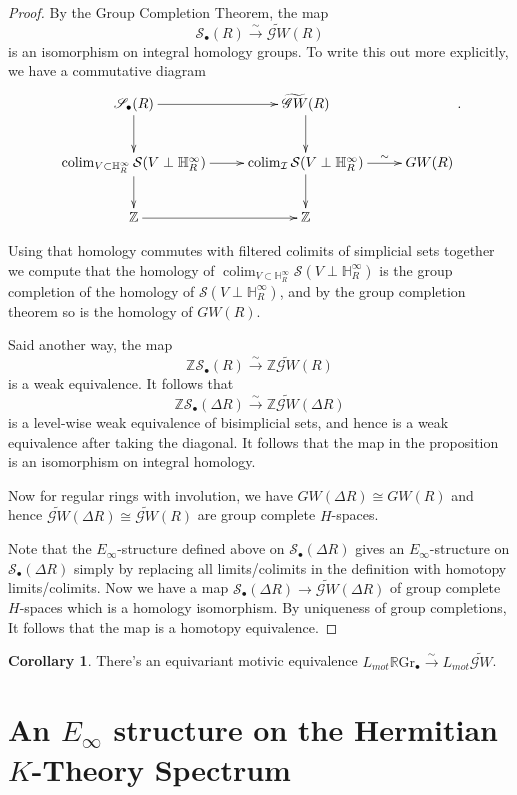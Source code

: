 \documentclass[draftthesis,tocnosub,noragright,centerchapter,10pt]{uiucthesis2009}
\newcommand{\Z}{\mathbb Z}
\newcommand{\mbb}{\mathbb}
\newcommand{\mc}{\mathcal}
\newcommand{\RGr}{\mathbb R\mathrm{Gr}}
\DeclareMathOperator*{\colim}{colim}
\theoremstyle{plain}
\theoremstyle{definition}
\newtheorem{corollary}[lemma]{Corollary}
\begin{document}
\begin{proof}
By the Group Completion Theorem, the map
\[
\mathscr S_\bullet( R) \xrightarrow{\sim} \widetilde{\mathscr{G}W}( R)
\]
is an isomorphism on integral homology groups. To write this out more
explicitly, we have a commutative diagram
\[
\xymatrix{\mathscr S_\bullet(R) \ar[r]\ar[d] &
  \widetilde{\mathscr{G}W}( R) \ar[d] \\
\colim_{V \subset \mbb H_R^\infty} \mc S(V \perp\mbb H_R^\infty) \ar[r]
\ar[d] & \colim_{\mc I}\mc S(V \perp\mbb H_R^\infty)  \ar[d] \ar[r]^-\sim
& GW(R)\\
\Z \ar[r] & \Z}.
\]

Using that homology commutes with filtered colimits of simplicial
sets together we compute that the homology of $\colim_{V \subset \mbb
  H_R^\infty} \mc S(V \perp\mbb H_R^\infty)$ is the group completion
of the homology of $\mc S(V \perp\mbb H_R^\infty)$, and by the group
completion theorem so is the homology of $GW(R)$.

 Said another way, the
map
\[
\Z\mathscr S_\bullet( R) \xrightarrow{\sim} \Z\widetilde{\mathscr{G}W}( R)
\]
is a weak equivalence. It follows that
\[
\Z\mathscr S_\bullet(\Delta R) \xrightarrow{\sim} \Z\widetilde{\mathscr{G}W}(\Delta R)
\]
is a level-wise weak equivalence of bisimplicial sets, and hence is a
weak equivalence after taking the diagonal. It follows that the map in
the proposition is an isomorphism on integral homology. 

Now for regular rings with involution, we have $GW(\Delta R) \cong
GW(R)$ and hence $\widetilde{\mathscr GW}(\Delta R) \cong
\widetilde{\mathscr GW}( R)$ are group complete $H$-spaces. 

Note that the $E_\infty$-structure defined above on $\mc
S_\bullet(\Delta R)$ gives an $E_\infty$-structure on $\mathscr
S_\bullet(\Delta R)$ simply by replacing all limits/colimits in the
definition with homotopy limits/colimits. Now we have a map $\mathscr
S_\bullet(\Delta R) \rightarrow \widetilde{\mathscr GW}(\Delta R)$ of
group complete $H$-spaces which is a homology isomorphism. By
uniqueness of group completions, It follows
that the map is a homotopy equivalence. 
\end{proof}

\begin{corollary}
There's an equivariant motivic equivalence $L_{mot}\RGr_\bullet
\xrightarrow{\sim} L_{mot}\widetilde{\mathscr{G}W}$.
\end{corollary}

\chapter{An $E_\infty$ structure on the Hermitian $K$-Theory Spectrum}
\end{document}
